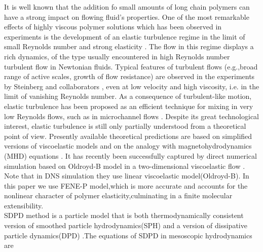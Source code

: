 \documentclass[aps,prl,twocolumn,showpacs,superscriptaddress,groupedaddress]{revtex4}  %
\begin{document}
It is well known that the addition fo small amounts of long chain polymers can have a strong impact on flowing fluid's properties.
One of the most remarkable effects of highly viscous polymer solutions which has been
observed in experiments is the development of an elastic turbulence regime in the limit of small Reynolds number and strong 
elasticity \cite{groisman00}. The flow in this regime displays a rich dynamics, of the type usually encountered
in high Reynolds number turbulent flow in Newtonian fluids. Typical features of turbulent flows (e.g.,broad
range of active scales, growth of flow resistance) are observed in the experiments by Steinberg and collaborators \cite{groisman00},
even at low velocity and high viscosity, i.e. in the limit of vanishing Reynolds number. As a consequence of 
turbulent-like motion, elastic turbulence has been proposed as an efficient technique for mixing in very
low Reynolds flows, such as in microchannel flows \cite{groisman01}. Despite its great technological interest, elastic turbulence
is still only partially understood from a theoretical point of view. Presently available theoretical predictions are
based on simplified versions of viscoelastic models and on the analogy with magnetohydrodynamics (MHD) equations \cite{balk01}\cite{fouxon03}. 
It has recently been successfully captured by direct numerical simulation based on Oldroyd-B model in a two-dimensional viscoelastic flow \cite{berti08}.
Note that in DNS simulation they use linear viscoelastic model(Oldroyd-B). In this paper we use FENE-P model,which is more accurate and accounts for the nonlinear character of polymer
elasticity,culminating in a finite molecular extensibility\cite{bird87}.\\
SDPD method is a particle model that is both thermodynamically consistent version of smoothed particle hydrodynamics(SPH) and a version of dissipative particle dynamics(DPD)
\cite{pep03}.The equations of SDPD in mesoscopic hydrodynamics are \cite{hu06}
\end{document}
